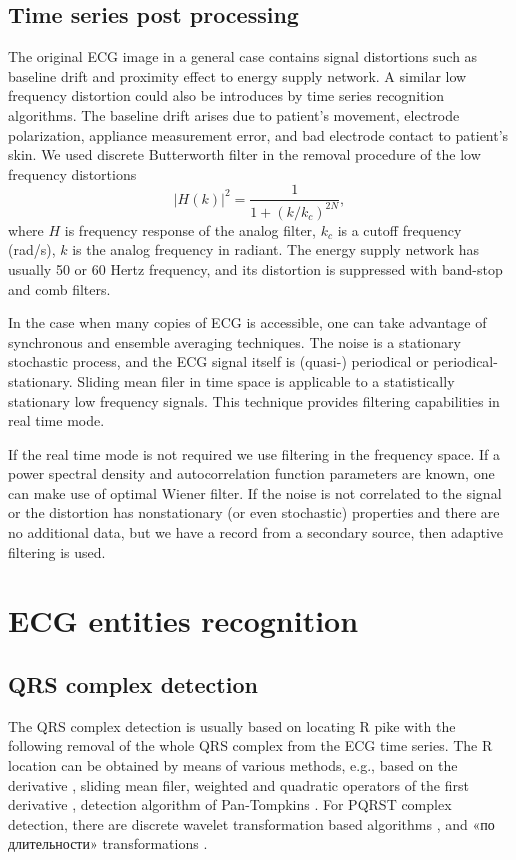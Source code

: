 \documentclass[runningheads]{AIIT}
\newcommand{\nnn}[2][rcolor]{\noindent%
\textcolor{eclr}{}\textcolor{#1}{#2}\textcolor{eclr}{}}
\begin{document}
\subsection{Time series post processing}
\label{sec:cleaning-artefacts}

The original ECG image in a general case contains signal distortions such as baseline drift and proximity effect to energy supply network.  A similar low frequency distortion could also be introduces by time series recognition algorithms.  The baseline drift arises due to patient's movement, electrode polarization, appliance measurement error, and bad electrode contact to patient's skin.  We used discrete Butterworth filter in the removal procedure of the low frequency distortions
$$
|H(k)|^2=\frac{1}{1+(k/k_c)^{2N}},
$$
where $H$ is frequency response of the analog filter, $k_c$ is a cutoff frequency (rad/s), $k$ is the analog frequency in radiant.  The energy supply network has usually 50 or 60 Hertz frequency, and its distortion is suppressed with band-stop and comb filters.

In the case when many copies of ECG is accessible, one can take advantage of synchronous and ensemble averaging techniques.  The noise is a stationary stochastic process, and the ECG signal itself is (quasi-) periodical or periodical-stationary.  Sliding mean filer in time space is applicable to a statistically stationary low frequency signals.  This technique provides filtering capabilities in real time mode.

If the real time mode is not required we use filtering in the frequency space.  If a power spectral density and autocorrelation function parameters are known, one can make use of optimal Wiener filter.  If the noise is not correlated to the signal or the distortion has nonstationary (or even stochastic) properties and there are no additional data, but we have a record from a secondary source, then adaptive filtering is used.

\section{ECG entities recognition}
\label{sec:ecg-etit-recogn}

\subsection{QRS complex detection}
\label{sec:qrs-compl-detect}

The QRS complex detection is usually based on locating R pike with the following removal of the whole QRS complex from the ECG time series.  The R location can be obtained by means of various methods, e.g., based on the derivative \cite{2}, sliding mean filer, weighted and quadratic operators of the first derivative \cite{3}, detection algorithm of Pan-Tompkins \cite{4}.  For PQRST complex detection, there are discrete wavelet transformation based algorithms \cite{5,6}, and \nnn{«по длительности»} transformations \cite{7}.
\end{document}
